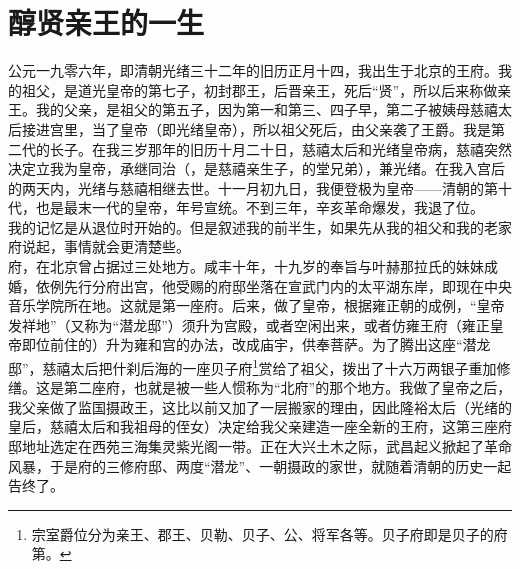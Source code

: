 \fancyhead[RO]{} %
\fancyhead[LE]{} %
\chapter*{醇贤亲王的一生}
\thispagestyle{empty}
  公元一九零六年，即清朝光绪三十二年的旧历正月十四，我出生于北京的王府。我的祖父，是道光皇帝的第七子，初封郡王，后晋亲王，死后“贤”，所以后来称做亲王。我的父亲，是祖父的第五子，因为第一和第三、四子早，第二子被姨母慈禧太后接进宫里，当了皇帝（即光绪皇帝），所以祖父死后，由父亲袭了王爵。我是第二代的长子。在我三岁那年的旧历十月二十日，慈禧太后和光绪皇帝病，慈禧突然决定立我为皇帝，承继同治（，是慈禧亲生子，的堂兄弟），兼光绪。在我入宫后的两天内，光绪与慈禧相继去世。十一月初九日，我便登极为皇帝——清朝的第十代，也是最末一代的皇帝，年号宣统。不到三年，辛亥革命爆发，我退了位。\\

  我的记忆是从退位时开始的。但是叙述我的前半生，如果先从我的祖父和我的老家府说起，事情就会更清楚些。\\

  府，在北京曾占据过三处地方。咸丰十年，十九岁的奉旨与叶赫那拉氏的妹妹成婚，依例先行分府出宫，他受赐的府邸坐落在宣武门内的太平湖东岸，即现在中央音乐学院所在地。这就是第一座府。后来，做了皇帝，根据雍正朝的成例，“皇帝发祥地”（又称为“潜龙邸”）须升为宫殿，或者空闲出来，或者仿雍王府（雍正皇帝即位前住的）升为雍和宫的办法，改成庙宇，供奉菩萨。为了腾出这座“潜龙邸”，慈禧太后把什刹后海的一座贝子府\footnote{宗室爵位分为亲王、郡王、贝勒、贝子、公、将军各等。贝子府即是贝子的府第。}赏给了祖父，拨出了十六万两银子重加修缮。这是第二座府，也就是被一些人惯称为“北府”的那个地方。我做了皇帝之后，我父亲做了监国摄政王，这比以前又加了一层搬家的理由，因此隆裕太后（光绪的皇后，慈禧太后和我祖母的侄女）决定给我父亲建造一座全新的王府，这第三座府邸地址选定在西苑三海集灵紫光阁一带。正在大兴土木之际，武昌起义掀起了革命风暴，于是府的三修府邸、两度“潜龙”、一朝摄政的家世，就随着清朝的历史一起告终了。\\

